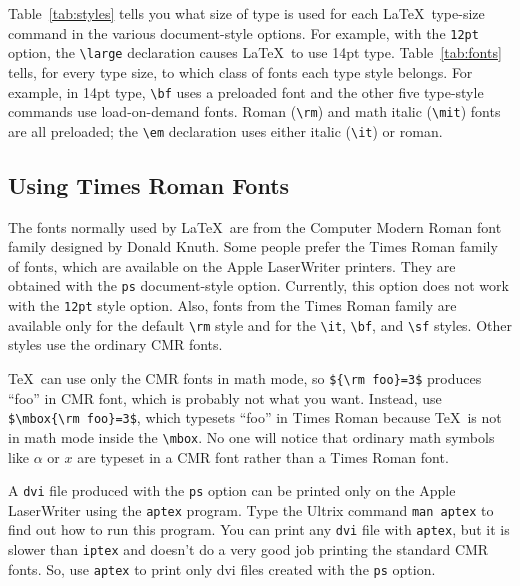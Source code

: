 Table~\ref{tab:styles} tells you what size of type is used for each
\LaTeX\ type-size command in the various document-style options.  For
example, with the {\tt 12pt} option, the \hbox{\verb|\large|}
declaration causes \LaTeX\ to use 14pt type.  Table~\ref{tab:fonts}
tells, for every type size, to which class of fonts each type style
belongs.  For example, in 14pt type, \verb|\bf| uses a preloaded
font and the other five type-style commands use load-on-demand fonts.
Roman (\verb|\rm|) and math italic (\verb|\mit|) fonts are all
preloaded; the \hbox{\verb|\em|} declaration uses either italic
(\verb|\it|) or roman.
 
 
 
 
\subsection{Using Times Roman Fonts} \label{sec:apple}
 
The fonts normally used by \LaTeX\ are from the Computer Modern Roman
font family designed by Donald Knuth.  Some people prefer the Times
Roman family of fonts, which are available on the Apple LaserWriter
printers.  They are obtained with the {\tt ps} document-style option.
Currently, this option does not work with the {\tt 12pt} style option.
Also, fonts from the Times Roman family are available only for the
default \verb|\rm| style and for the \verb|\it|, \verb|\bf|, and
\verb|\sf| styles.  Other styles use the ordinary CMR fonts.
 
\TeX\ can use only the CMR fonts in math mode, so \verb|${\rm foo}=3$|
produces ``foo'' in CMR font, which is probably not what you want.
Instead, use \verb|$\mbox{\rm foo}=3$|, which typesets ``foo'' in Times
Roman because \TeX\ is not in math mode inside the \verb|\mbox|.  No
one will notice that ordinary math symbols like $\alpha$ or $x$ are
typeset in a CMR font rather than a Times Roman font.
 
A {\tt dvi} file produced with the {\tt ps} option can be printed only
on the Apple LaserWriter using the {\tt aptex\/} program.  Type the
Ultrix command {\tt man~aptex} to find out how to run this program.
You can print any {\tt dvi} file with {\tt aptex}, but it is slower
than {\tt iptex} and doesn't do a very good job printing the
standard CMR fonts.  So, use {\tt aptex} to print only {dvi} files
created with the {\tt ps} option.
 
